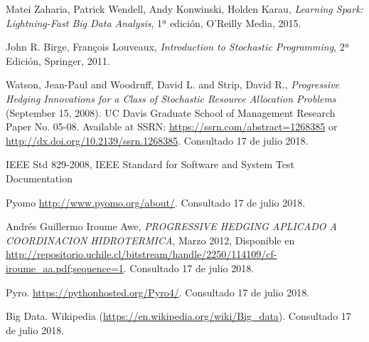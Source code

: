 

\begin{thebibliography}{99}
% 
% 
% 

 Matei Zaharia, Patrick Wendell, Andy Konwinski, Holden Karau, {\it Learning Spark: Lightning-Fast Big Data Analysis}, 1ª edición, O'Reilly Media, 2015.

 John R. Birge, François Louveaux, {\it Introduction to Stochastic Programming}, 2ª Edición, Springer, 2011.

  Watson, Jean-Paul and Woodruff, David L. and Strip, David R., {\it Progressive Hedging Innovations for a Class of Stochastic Resource Allocation Problems} (September 15, 2008). UC Davis Graduate School of Management Research Paper No. 05-08. Available at SSRN: \url{https://ssrn.com/abstract=1268385} or \url{http://dx.doi.org/10.2139/ssrn.1268385}. Consultado 17 de julio 2018.

 IEEE Std 829-2008, IEEE Standard for Software and System Test Documentation

 Pyomo \url{http://www.pyomo.org/about/}. Consultado 17 de julio 2018.

 Andrés Guillermo Iroume Awe, {\it PROGRESSIVE  HEDGING APLICADO A COORDINACION HIDROTERMICA}, Marzo 2012, Disponible en \url{http://repositorio.uchile.cl/bitstream/handle/2250/114109/cf-iroume_aa.pdf;sequence=1}. Consultado 17 de julio 2018.

 Pyro. \url{https://pythonhosted.org/Pyro4/}. Consultado 17 de julio 2018.

 Big Data. Wikipedia (\url{https://en.wikipedia.org/wiki/Big\_data}). Consultado 17 de julio 2018.


\end{thebibliography}
